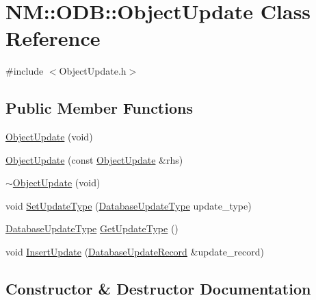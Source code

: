 \hypertarget{class_n_m_1_1_o_d_b_1_1_object_update}{}\section{N\+M\+:\+:O\+D\+B\+:\+:Object\+Update Class Reference}
\label{class_n_m_1_1_o_d_b_1_1_object_update}


{\ttfamily \#include $<$Object\+Update.\+h$>$}

\subsection*{Public Member Functions}
\begin{DoxyCompactItemize}
\item 
\hyperlink{class_n_m_1_1_o_d_b_1_1_object_update_a6e7c6413cce92c16aa6b80cf41a9de26}{Object\+Update} (void)
\item 
\hyperlink{class_n_m_1_1_o_d_b_1_1_object_update_a942f9dc0adda67c3c96dadd4ecae4ba9}{Object\+Update} (const \hyperlink{class_n_m_1_1_o_d_b_1_1_object_update}{Object\+Update} \&rhs)
\item 
\hyperlink{class_n_m_1_1_o_d_b_1_1_object_update_a551a1bc9318051cfd2eb84240d36fdab}{$\sim$\+Object\+Update} (void)
\item 
void \hyperlink{class_n_m_1_1_o_d_b_1_1_object_update_a56e307f1e2d9d94002062d19e2b97c13}{Set\+Update\+Type} (\hyperlink{namespace_n_m_1_1_o_d_b_a66aebefa38a81f7eeb64526035e77dfa}{Database\+Update\+Type} update\+\_\+type)
\item 
\hyperlink{namespace_n_m_1_1_o_d_b_a66aebefa38a81f7eeb64526035e77dfa}{Database\+Update\+Type} \hyperlink{class_n_m_1_1_o_d_b_1_1_object_update_a44261733cc151459fb7b1d9d40909d95}{Get\+Update\+Type} ()
\item 
void \hyperlink{class_n_m_1_1_o_d_b_1_1_object_update_a94c8541eeeb996b06302c3de4eb1728e}{Insert\+Update} (\hyperlink{class_n_m_1_1_o_d_b_1_1_database_update_record}{Database\+Update\+Record} \&update\+\_\+record)
\end{DoxyCompactItemize}


\subsection{Constructor \& Destructor Documentation}
\hypertarget{class_n_m_1_1_o_d_b_1_1_object_update_a6e7c6413cce92c16aa6b80cf41a9de26}{}
